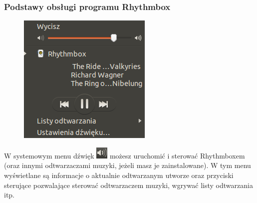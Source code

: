 \subsubsection{Podstawy obsługi programu Rhythmbox}
\begin{figure}
	\vspace{-10pt}
	\includegraphics[width=\linewidth]{images/programy_rhythmbox2.png}
\end{figure}

W systemowym menu dźwięk \includegraphics{images/ikony_dzwiek.png} możesz uruchomić i sterować Rhythmboxem (oraz innymi odtwarzaczami muzyki, jeżeli masz je zainstalowane). W tym menu wyświetlane są informacje o aktualnie odtwarzanym utworze oraz przyciski sterujące pozwalające sterować odtwarzaczem muzyki, wgrywać listy odtwarzania itp.

